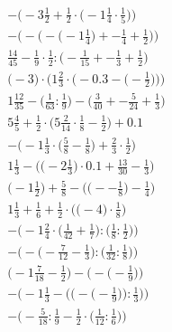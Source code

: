 \documentclass[8pt]{article}
\begin{document}
\begin{align}
-\Big(-3\frac{1}{2} + \frac{1}{2} \cdot \big(-1\frac{1}{4} \cdot \frac{1}{5}\big)\Big) \\
-\bigg(-\Big(-\big(-1\frac{1}{4}\big) + -\frac{1}{4} + \frac{1}{2}\Big)\bigg) \\
\frac{14}{45} - \frac{1}{9} \cdot \frac{1}{2} : \big(-\frac{1}{15} + -\frac{1}{3} + \frac{1}{2}\big) \\
\bigg(-3\bigg) \cdot \bigg(1\frac{2}{3} \cdot \Big(-0.3 - \big(-\frac{1}{2}\big)\Big)\bigg) \\
1\frac{12}{35} - \big(\frac{1}{63} : \frac{1}{9}\big) - \big(\frac{3}{40} + -\frac{5}{24} + \frac{1}{3}\big) \\
5\frac{4}{5} + \frac{1}{2} \cdot \big(5\frac{2}{14} \cdot \frac{1}{8} - \frac{1}{2}\big) + 0.1 \\
-\Big(-1\frac{1}{3} \cdot \big(\frac{5}{8} - \frac{1}{8}\big) + \frac{2}{3} \cdot \frac{1}{2}\Big) \\
1\frac{1}{3} - \Big(\big(-2\frac{1}{3}\big) \cdot 0.1 + \frac{13}{30} - \frac{1}{3}\Big) \\
\Big(-1\frac{1}{2}\Big) + \frac{5}{8} - \Big(\big(--\frac{1}{8}\big) - \frac{1}{4}\Big) \\
1\frac{1}{3} + \frac{1}{6} + \frac{1}{2} \cdot \Big(\big(-4\big) \cdot \frac{1}{8}\Big) \\
-\Big(-1\frac{2}{4} \cdot \big(\frac{1}{42} + \frac{1}{7}\big) : \big(\frac{1}{8} : \frac{1}{2}\big)\Big) \\
-\Big(-\big(-\frac{7}{12} - \frac{1}{3}\big) : \big(\frac{1}{32} : \frac{1}{8}\big)\Big) \\
\Big(-1\frac{7}{18} - \frac{1}{2}\Big) - \Big(-\big(-\frac{1}{9}\big)\Big) \\
-\Bigg(-1\frac{1}{3} - \bigg(\Big(-\big(-\frac{1}{9}\big)\Big) : \frac{1}{3}\bigg)\Bigg) \\
-\Big(-\frac{5}{18} : \frac{1}{9} - \frac{1}{2} \cdot \big(\frac{1}{12} : \frac{1}{6}\big)\Big)
\end{align}
\end{document}
